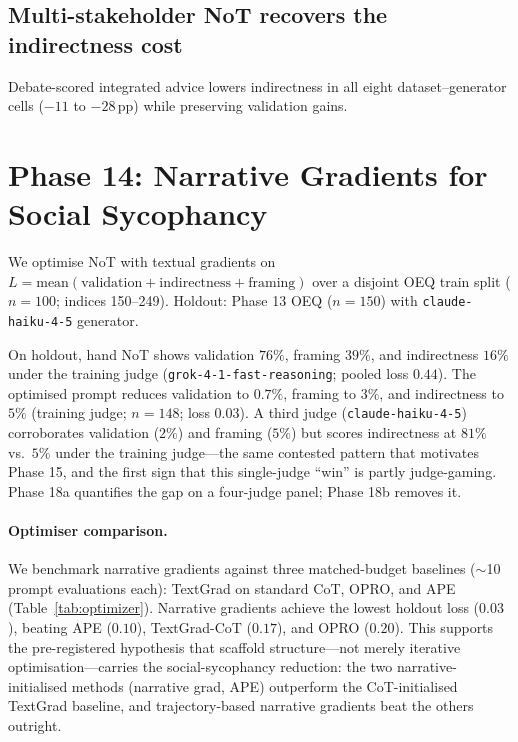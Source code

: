 \documentclass[11pt]{article}
\begin{document}
\subsection{Multi-stakeholder NoT recovers the indirectness cost}
\label{sec:debate}
Debate-scored integrated advice lowers indirectness in all eight dataset--generator cells ($-11$ to $-28$\,pp) while preserving validation gains.

\section{Phase 14: Narrative Gradients for Social Sycophancy}
\label{sec:phase14}

We optimise NoT with textual gradients on
$L = \mathrm{mean}(\text{validation} + \text{indirectness} + \text{framing})$
over a disjoint OEQ train split ($n{=}100$; indices 150--249).
Holdout: Phase 13 OEQ ($n{=}150$) with \texttt{claude-haiku-4-5} generator.

On holdout, hand NoT shows validation $76\%$, framing $39\%$, and indirectness $16\%$ under the training judge (\texttt{grok-4-1-fast-reasoning}; pooled loss $0.44$).
The optimised prompt reduces validation to $0.7\%$, framing to $3\%$, and indirectness to $5\%$ (training judge; $n{=}148$; loss $0.03$).
A third judge (\texttt{claude-haiku-4-5}) corroborates validation ($2\%$) and framing ($5\%$) but scores indirectness at $81\%$ vs.\ $5\%$ under the training judge---the same contested pattern that motivates Phase 15, and the first sign that this single-judge ``win'' is partly judge-gaming. Phase 18a quantifies the gap on a four-judge panel; Phase 18b removes it.

\paragraph{Optimiser comparison.}
We benchmark narrative gradients against three matched-budget baselines ($\sim$10 prompt evaluations each): TextGrad on standard CoT, OPRO, and APE (Table~\ref{tab:optimizer}).
Narrative gradients achieve the lowest holdout loss ($0.03$), beating APE ($0.10$), TextGrad-CoT ($0.17$), and OPRO ($0.20$).
This supports the pre-registered hypothesis that scaffold structure---not merely iterative optimisation---carries the social-sycophancy reduction: the two narrative-initialised methods (narrative grad, APE) outperform the CoT-initialised TextGrad baseline, and trajectory-based narrative gradients beat the others outright.
\end{document}
